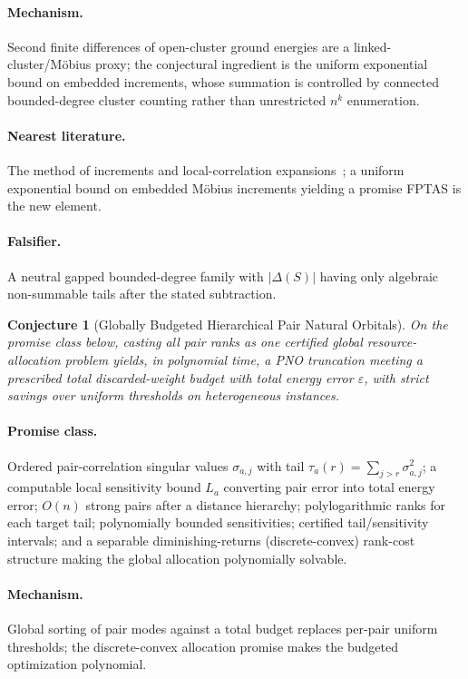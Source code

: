 \documentclass[11pt]{article}
\newtheorem{conjecture}{Conjecture}
\theoremstyle{definition}
\newcommand{\eps}{\varepsilon}
\begin{document}
\paragraph{Mechanism.}  Second finite differences of open-cluster ground energies
are a linked-cluster/M\"obius proxy; the conjectural ingredient is the uniform
exponential bound on embedded increments, whose summation is controlled by
connected bounded-degree cluster counting rather than unrestricted $n^k$
enumeration.
\paragraph{Nearest literature.}  The method of increments and local-correlation
expansions~\cite{R19}; a uniform exponential bound on embedded M\"obius increments
yielding a promise FPTAS is the new element.
\paragraph{Falsifier.}  A neutral gapped bounded-degree family with $|\Delta(S)|$
having only algebraic non-summable tails after the stated subtraction.

\begin{conjecture}[Globally Budgeted Hierarchical Pair Natural Orbitals]\label{p10}
On the promise class below, casting all pair ranks as one certified global
resource-allocation problem yields, in polynomial time, a PNO truncation meeting a
prescribed total discarded-weight budget with total energy error $\eps$, with
strict savings over uniform thresholds on heterogeneous instances.
\end{conjecture}
\paragraph{Promise class.}  Ordered pair-correlation singular values
$\sigma_{a,j}$ with tail $\tau_a(r)=\sum_{j>r}\sigma_{a,j}^2$; a computable local
sensitivity bound $L_a$ converting pair error into total energy error; $O(n)$
strong pairs after a distance hierarchy; polylogarithmic ranks for each target
tail; polynomially bounded sensitivities; certified tail/sensitivity intervals;
and a separable diminishing-returns (discrete-convex) rank-cost structure making
the global allocation polynomially solvable.
\paragraph{Mechanism.}  Global sorting of pair modes against a total budget
replaces per-pair uniform thresholds; the discrete-convex allocation promise makes
the budgeted optimization polynomial.
\end{document}
